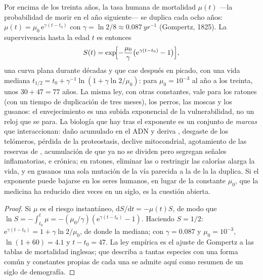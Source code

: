 \begin{proposition}\label{prop:b3:stem-cells:gompertz}
Por encima de los treinta años, la tasa humana de mortalidad $\mu(t)$
---la probabilidad de morir en el año siguiente--- se duplica cada ocho
años: $\mu(t) =
\mu_{0}\,\mathrm{e}^{\gamma(t - t_{0})}$ con $\gamma = \ln 2/8 \approx
\qty{0.087}{yr^{-1}}$ (Gompertz, 1825). La supervivencia hasta la edad
$t$ es entonces
\[
S(t) = \exp\!\Bigl[-\frac{\mu_{0}}{\gamma}\bigl(\mathrm{e}^{\gamma(t - t_{0})} - 1\bigr)\Bigr],
\]
una curva plana durante décadas y que cae después en picado, con una
vida mediana $t_{1/2} = t_{0} + \gamma^{-1}\ln(1 + \gamma\ln 2/\mu_{0})$:
para $\mu_{0} = 10^{-3}$ al año a los treinta, unos $30 + 47 = 77$
años. La misma ley, con otras constantes, vale para los ratones (con un
tiempo de duplicación de tres meses), los perros, las moscas y los
gusanos: el envejecimiento es una subida exponencial de la
vulnerabilidad, no un reloj que se para. La biología que hay tras el
exponente es un conjunto de \emph{marcas} que interaccionan: daño
acumulado en el ADN y deriva , desgaste de los telómeros,
pérdida de la proteostasis, declive mitocondrial, agotamiento de las
reservas de , acumulación de \emph{}
que ya no se dividen pero segregan señales inflamatorias, e
 crónica; en ratones, eliminar las  o
restringir las calorías alarga la vida, y en gusanos una sola mutación
de la vía parecida a la de la  la duplica. Si el exponente
puede bajarse en los seres humanos, en lugar de la constante $\mu_{0}$,
que la medicina ha reducido diez veces en un siglo, es la cuestión
abierta.
\end{proposition}
\begin{proof}
Si $\mu$ es el riesgo instantáneo,
$\mathrm{d}S/\mathrm{d}t = -\mu(t)S$, de modo que $\ln S =
-\int_{t_{0}}^{t}\mu = -(\mu_{0}/\gamma)(\mathrm{e}^{\gamma(t-t_{0})} -
1)$. Haciendo $S = 1/2$: $\mathrm{e}^{\gamma(t-t_{0})} = 1 + \gamma\ln 2/
\mu_{0}$, de donde la mediana; con $\gamma = 0.087$ y $\mu_{0} =
10^{-3}$, $\ln(1 + 60) = 4.1$ y $t - t_{0} = 47$. La ley empírica es el
ajuste de Gompertz a las tablas de mortalidad inglesas; que describa a
tantas especies con una forma común y constantes propias de cada una se
admite aquí como resumen de un siglo de demografía.
\end{proof}

